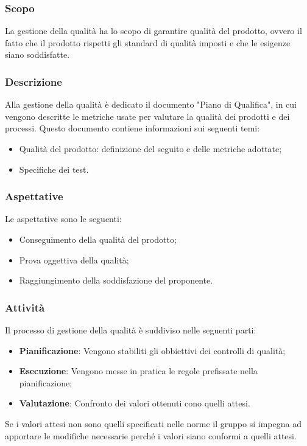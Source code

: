 \documentclass[../norme_di_progetto.tex]{subfiles}
\begin{document}
\subsubsection{Scopo}
La gestione della qualità ha lo scopo di garantire qualità del prodotto, ovvero il fatto che il prodotto rispetti gli standard di qualità imposti e che le esigenze siano soddisfatte.

\subsubsection{Descrizione}
Alla gestione della qualità è dedicato il documento "Piano di Qualifica", in cui vengono descritte le metriche usate per valutare la qualità dei prodotti e dei processi. Questo documento contiene informazioni sui seguenti temi:
\begin{itemize}
    \item Qualità del prodotto: definizione del  seguito e delle metriche adottate;
    \item Specifiche dei test.
\end{itemize}

\subsubsection{Aspettative}
Le aspettative sono le seguenti:
\begin{itemize}
    \item Conseguimento della qualità del prodotto;
    \item Prova oggettiva della qualità;
    \item Raggiungimento della soddisfazione del proponente.
\end{itemize}

\subsubsection{Attività}
Il processo di gestione della qualità è suddiviso nelle seguenti parti:
\begin{itemize}
    \item \textbf{Pianificazione}: Vengono stabiliti gli obbiettivi dei controlli di qualità;
    \item \textbf{Esecuzione}: Vengono messe in pratica le regole prefissate nella pianificazione;
    \item \textbf{Valutazione}: Confronto dei valori ottenuti cono quelli attesi.
\end{itemize}
Se i valori attesi non sono quelli specificati nelle norme il gruppo si impegna ad apportare le modifiche necessarie perché i valori siano conformi a quelli attesi.
\end{document}
